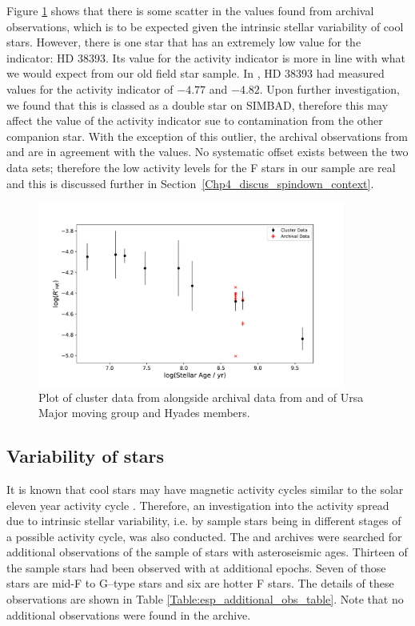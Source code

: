 Figure \ref{fig:cluster_data_comparison} shows that there is some scatter in the \Rprime values found from archival observations, which is to be expected given the intrinsic stellar variability of cool stars. However, there is one star that has an extremely low value for the \Rprime indicator: HD 38393. Its value for the \Rprime activity indicator is more in line with what we would expect from our old field star sample. In \citet{Mamajek_Hillenbrand_2008}, HD 38393 had measured values for the \Rprime activity indicator of $-4.77$ and $-4.82$. Upon further investigation, we found that this is classed as a double star on SIMBAD, therefore this may affect the value of the \Rprime activity indicator sue to contamination from the other companion star. With the exception of this outlier, the archival observations from \esp and \narval are in agreement with the \citet{Mamajek_Hillenbrand_2008} values. No systematic offset exists between the two data sets; therefore the low activity levels for the F stars in our sample are real and this is discussed further in Section~\ref{Chp4_discus_spindown_context}.

\begin{figure}
    \centering
    \includegraphics[width=0.9\textwidth]{Figures/4-Chromospheric_age/cluster_data.pdf}
    \caption[Analysis of cluster members]{Plot of cluster data from \citet{Mamajek_Hillenbrand_2008} alongside archival data from \esp and \narval of Ursa Major moving group and Hyades members.}
    \label{fig:cluster_data_comparison}
\end{figure}

\subsection{Variability of stars}
\label{Chp4_results_variability}
It is known that cool stars may have magnetic activity cycles similar to the solar eleven year activity cycle \citep{Wilson_1978,Baliunas_etal_1995}. Therefore, an investigation into the activity spread due to intrinsic stellar variability, i.e. by sample stars being in different stages of a possible activity cycle, was also conducted. The \esp and \narval archives were searched for additional observations of the sample of stars with asteroseismic ages. Thirteen of the sample stars had been observed with \esp at additional epochs. Seven of those stars are mid-F to G--type stars and six are hotter F stars. The details of these observations are shown in Table \ref{Table:esp_additional_obs_table}. Note that no additional observations were found in the \narval archive.

